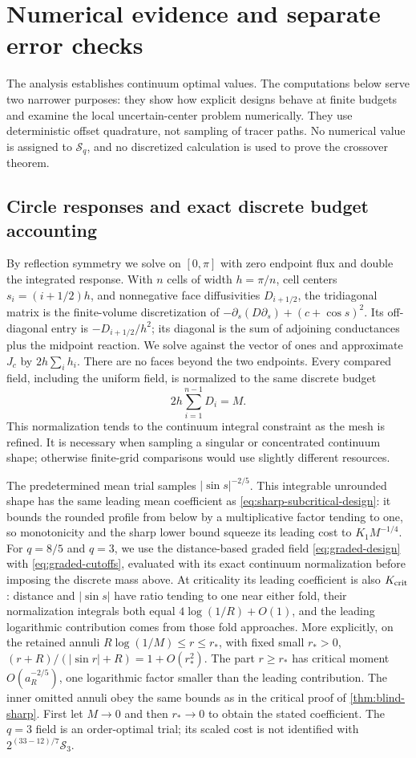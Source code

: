\section{Numerical evidence and separate error checks}
\label{sec:numerics}
The analysis establishes continuum optimal values. The computations
below serve two narrower purposes: they show how explicit designs
behave at finite budgets and examine the local uncertain-center
problem numerically. They use deterministic offset quadrature, not
sampling of tracer paths. No numerical value is assigned to
$\mathcal S_q$, and no discretized calculation is used to prove
the crossover theorem.

\subsection{Circle responses and exact discrete budget accounting}
By reflection symmetry we solve on $[0,\pi]$ with zero endpoint
flux and double the integrated response. With $n$ cells of width
$h=\pi/n$, cell centers $s_i=(i+1/2)h$, and nonnegative
face diffusivities $D_{i+1/2}$, the tridiagonal matrix is the
finite-volume discretization of
$-\partial_s(D\partial_s)+(c+\cos s)^2$. Its off-diagonal entry
is $-D_{i+1/2}/h^2$; its diagonal is the sum of adjoining
conductances plus the midpoint reaction. We solve against the
vector of ones and approximate $J_c$ by $2h\sum_i h_i$.
There are no faces beyond the two endpoints.
Every compared field, including the uniform field, is normalized
to the same discrete budget
\[
                   2h\sum_{i=1}^{n-1}D_i=M.
\]
This normalization tends to the continuum integral constraint as
the mesh is refined. It is necessary when sampling a singular or
concentrated continuum shape; otherwise finite-grid comparisons
would use slightly different resources.

The predetermined mean trial samples $|\sin s|^{-2/5}$. This
integrable unrounded shape has the same leading mean coefficient
as \eqref{eq:sharp-subcritical-design}: it bounds the rounded
profile from below by a multiplicative factor tending to one,
so monotonicity and the sharp lower bound squeeze its leading
cost to $K_1M^{-1/4}$. For $q=8/5$ and $q=3$, we use the
distance-based graded field \eqref{eq:graded-design} with
\eqref{eq:graded-cutoffs}, evaluated with its exact continuum
normalization before imposing the discrete mass above.
At criticality its leading coefficient is also $K_{\rm crit}$:
distance and $|\sin s|$ have ratio tending to one near either
fold, their normalization integrals both equal
$4\log(1/R)+O(1)$, and the leading logarithmic contribution
comes from those fold approaches.
More explicitly, on the retained annuli
$R\log(1/M)\le r\le r_*$, with fixed small $r_*>0$,
$(r+R)/(|\sin r|+R)=1+O(r_*^2)$. The part $r\ge r_*$
has critical moment $O(a_R^{-2/5})$, one logarithmic factor
smaller than the leading contribution. The inner omitted annuli
obey the same bounds as in the critical proof of
\cref{thm:blind-sharp}. First let $M\to0$ and then
$r_*\to0$ to obtain the stated coefficient.
The $q=3$ field is an
order-optimal trial; its scaled cost is not identified with
$2^{(33-12)/7}\mathcal S_3$.

